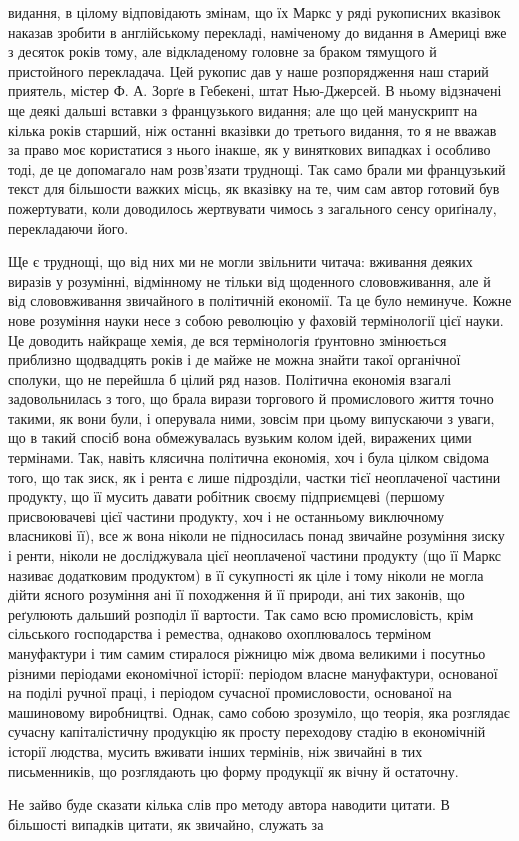видання, в цілому відповідають змінам, що їх Маркс у ряді рукописних
вказівок наказав зробити в англійському перекладі, наміченому
до видання в Америці вже з десяток років тому, але відкладеному
головне за браком тямущого й пристойного перекладача.
Цей рукопис дав у наше розпорядження наш старий приятель,
містер Ф. А. Зорґе в Гебекені, штат Нью-Джерсей. В ньому
відзначені ще деякі дальші вставки з французького видання;
але що цей манускрипт на кілька років старший, ніж останні вказівки
до третього видання, то я не вважав за право моє користатися
з нього інакше, як у виняткових випадках і особливо тоді,
де це допомагало нам розв’язати труднощі. Так само брали ми
французький текст для більшости важких місць, як вказівку на те,
чим сам автор готовий був пожертувати, коли доводилось жертвувати
чимось з загального сенсу ориґіналу, перекладаючи його.

Ще є труднощі, що від них ми не могли звільнити читача: вживання
деяких виразів у розумінні, відмінному не тільки від щоденного
слововживання, але й від слововживання звичайного в
політичній економії. Та це було неминуче. Кожне нове розуміння
науки несе з собою революцію у фаховій термінології цієї науки.
Це доводить найкраще хемія, де вся термінологія ґрунтовно змінюється
приблизно щодвадцять років і де майже не можна знайти
такої органічної сполуки, що не перейшла б цілий ряд назов.
Політична економія взагалі задовольнилась з того, що брала
вирази торгового й промислового життя точно такими, як вони
були, і оперувала ними, зовсім при цьому випускаючи з уваги, що
в такий спосіб вона обмежувалась вузьким колом ідей, виражених
цими термінами. Так, навіть клясична політична економія, хоч
і була цілком свідома того, що так зиск, як і рента є лише підрозділи,
частки тієї неоплаченої частини продукту, що її мусить
давати робітник своєму підприємцеві (першому присвоювачеві
цієї частини продукту, хоч і не останньому виключному власникові
її), все ж вона ніколи не підносилась понад звичайне розуміння
зиску і ренти, ніколи не досліджувала цієї неоплаченої
частини продукту (що її Маркс називає додатковим продуктом)
в її сукупності як ціле і тому ніколи не могла дійти ясного розуміння
ані її походження й її природи, ані тих законів, що реґулюють
дальший розподіл її вартости. Так само всю промисловість,
крім сільського господарства і ремества, однаково охоплювалось
терміном мануфактури і тим самим стиралося ріжницю між двома
великими і посутньо різними періодами економічної історії: періодом
власне мануфактури, основаної на поділі ручної праці,
і періодом сучасної промисловости, основаної на машиновому
виробництві. Однак, само собою зрозуміло, що теорія, яка розглядає
сучасну капіталістичну продукцію як просту переходову
стадію в економічній історії людства, мусить вживати інших
термінів, ніж звичайні в тих письменників, що розглядають цю
форму продукції як вічну й остаточну.

Не зайво буде сказати кілька слів про методу автора наводити
цитати. В більшості випадків цитати, як звичайно, служать за
